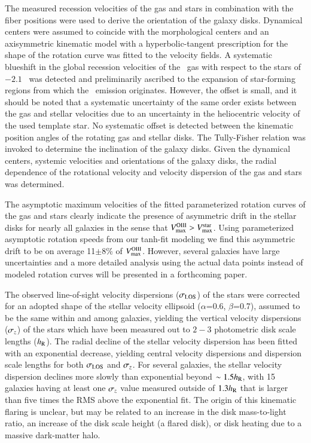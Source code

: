 \documentclass[traditabstract]{aa} %
\begin{document}
The measured recession velocities of the gas and stars in combination with the
fiber positions were used to derive the orientation of the galaxy disks.
Dynamical centers were assumed to coincide with the morphological centers and an
axisymmetric kinematic model with a hyperbolic-tangent prescription for the
shape of the rotation curve was fitted to the velocity fields.  A systematic
blueshift in the global recession velocities of the \oiii\ gas with respect to
the stars of $-2.1$ \kms\ was detected and preliminarily ascribed to the
expansion of star-forming regions from which the \oiii\ emission originates.
However, the offset is small, and it should be noted that a systematic
uncertainty of the same order exists between the gas and stellar velocities due
to an uncertainty in the heliocentric velocity of the used template star.  No
systematic offset is detected between the kinematic position angles of the
rotating gas and stellar disks.  The Tully-Fisher relation \citep{verheyen2001b}
was invoked to determine the inclination of the galaxy disks.  Given the
dynamical centers, systemic velocities and orientations of the galaxy disks, the
radial dependence of the rotational velocity and velocity dispersion of the gas
and stars was determined. 

The asymptotic maximum velocities of the fitted parameterized rotation curves
of the gas and stars clearly indicate the presence of asymmetric drift in the
stellar disks for nearly all galaxies in the sense that
$V_{\rm max}^{\rm OIII}>V_{\rm max}^{\rm star}$. Using parameterized asymptotic rotation
speeds from our tanh-fit modeling we find this asymmetric drift to be on average
11$\pm$8\% of $V_{\rm max}^{\rm OIII}$. However, several galaxies have large uncertainties
and a more detailed analysis using the actual data points instead of modeled rotation
curves will be presented in a forthcoming paper.

The observed line-of-sight velocity dispersions ($\sigma_{\rm LOS}$) of the stars were
corrected for an adopted shape of the stellar velocity ellipsoid ($\alpha$=0.6,
$\beta$=0.7), assumed to be the same within and among galaxies, yielding the
vertical velocity dispersions ($\sigma_z$) of the stars which have been measured
out to $2-3$ photometric disk scale lengths ($h_{\rm R}$). The radial decline of the
stellar velocity dispersion has been fitted with an exponential decrease, yielding
central velocity dispersions and dispersion scale lengths for both $\sigma_{\rm LOS}$ and
$\sigma_z$. For several galaxies, the stellar velocity dispersion declines more slowly
than exponential beyond $\sim1.5h_{\rm R}$, with 15 galaxies having at least one $\sigma_z$
value measured outside of $1.3h_{\rm R}$ that is larger than five times the RMS above the
exponential fit.  The origin of this kinematic flaring is unclear, but may be related
to an increase in the disk mass-to-light ratio, an increase of the disk scale height
(a flared disk), or disk heating due to a massive dark-matter halo.
\end{document}
